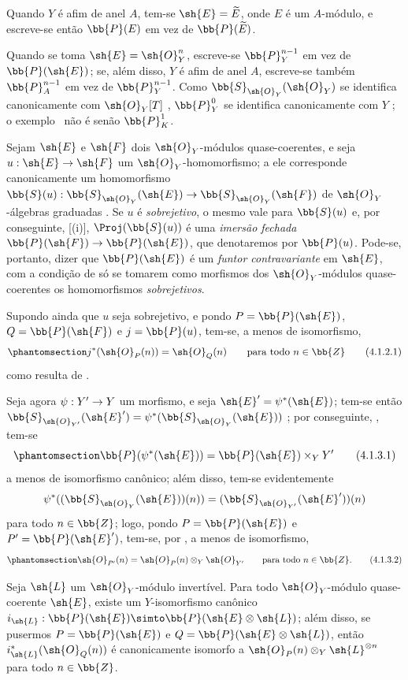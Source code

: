 \documentclass[oneside,10pt]{amsart}
\makeatletter
\newcommand{\ega@arrow}[2]{\mathchoice{#1}{#2}{#2}{#2}}
\renewcommand{\to}{\ega@arrow{\longrightarrow}{\rightarrow}}
\newcommand{\oldpage}[2][]{\marginnote{\normalfont\footnotesize\textbf{#1}~|~#2}\ignorespaces}
\let\EGAOriginalLabel\label
\renewcommand{\label}[1]{\phantomsection\EGAOriginalLabel{#1}}
\makeatother
\begin{document}
Quando $Y$ é afim de anel $A$, tem-se $\sh{E}=\widetilde{E}$, onde $E$ é um $A$-módulo, e escreve-se então $\bb{P}(E)$ em vez de $\bb{P}(\widetilde{E})$.

Quando se toma $\sh{E}=\sh{O}_Y^n$, escreve-se $\bb{P}_Y^{n-1}$ em vez de $\bb{P}(\sh{E})$;
se, além disso, $Y$ é afim de anel $A$, escreve-se também $\bb{P}_A^{n-1}$ em vez de $\bb{P}_Y^{n-1}$.
Como $\bb{S}_{\sh{O}_Y}(\sh{O}_Y)$ se identifica canonicamente com $\sh{O}_Y[T]$ , $\bb{P}_Y^0$ se identifica canonicamente com $Y$ ;
o exemplo~ não é senão $\bb{P}_K^1$.

\begin{env}[4.1.2]
\label{II.4.1.2}
Sejam $\sh{E}$ e $\sh{F}$ dois $\sh{O}_Y$-módulos quase-coerentes, e seja $u:\sh{E}\to\sh{F}$ um $\sh{O}_Y$-homomorfismo;
a ele corresponde canonicamente um homomorfismo $\bb{S}(u):\bb{S}_{\sh{O}_Y}(\sh{E})\to\bb{S}_{\sh{O}_Y}(\sh{F})$ de $\sh{O}_Y$-álgebras graduadas .
Se $u$ é \emph{sobrejetivo}, o mesmo vale para $\bb{S}(u)$ e, por conseguinte, [(i)], $\Proj(\bb{S}(u))$ é uma \emph{imersão fechada} $\bb{P}(\sh{F})\to\bb{P}(\sh{E})$, que denotaremos por $\bb{P}(u)$.
Pode-se, portanto, dizer que $\bb{P}(\sh{E})$ é um \emph{funtor contravariante} em $\sh{E}$, com a condição de só se tomarem como morfismos dos $\sh{O}_Y$-módulos quase-coerentes os homomorfismos \emph{sobrejetivos}.

Supondo ainda que $u$ seja sobrejetivo, e pondo $P=\bb{P}(\sh{E})$, $Q=\bb{P}(\sh{F})$ e $j=\bb{P}(u)$, tem-se, a menos de isomorfismo,
\[
\label{II.4.1.2.1}
  j^*(\sh{O}_P(n)) = \sh{O}_Q(n)
  \qquad\mbox{para todo $n\in\bb{Z}$}
  \tag{4.1.2.1}
\]
como resulta de .
\end{env}

\begin{env}[4.1.3]
\label{II.4.1.3}
Seja agora $\psi:Y'\to Y$ um morfismo, e seja $\sh{E}'=\psi^*(\sh{E})$;
tem-se então $\bb{S}_{\sh{O}_{Y'}}(\sh{E}')=\psi^*(\bb{S}_{\sh{O}_Y}(\sh{E}))$ ;
por conseguinte, , tem-se
\[
\label{II.4.1.3.1}
  \bb{P}(\psi^*(\sh{E})) = \bb{P}(\sh{E})\times_Y Y'
  \tag{4.1.3.1}
\]
a menos de isomorfismo canônico;
além disso, tem-se evidentemente
\[
  \psi^*((\bb{S}_{\sh{O}_Y}(\sh{E}))(n)) = (\bb{S}_{\sh{O}_{Y'}}(\sh{E}'))(n)
\]
para todo $n\in\bb{Z}$; logo, pondo $P=\bb{P}(\sh{E})$ e $P'=\bb{P}(\sh{E}')$, tem-se, por , a menos de isomorfismo,
\[
\label{II.4.1.3.2}
  \sh{O}_{P'}(n) = \sh{O}_P(n)\otimes_Y\sh{O}_{Y'}
  \qquad\mbox{para todo $n\in\bb{Z}$.}
  \tag{4.1.3.2}
\]
\end{env}
\oldpage[II]{72}
\begin{proposition}[4.1.4]
\label{II.4.1.4}
Seja $\sh{L}$ um $\sh{O}_Y$-módulo invertível.
Para todo $\sh{O}_Y$-módulo quase-coerente $\sh{E}$, existe um $Y$-isomorfismo canônico $i_\sh{L}:\bb{P}(\sh{E})\simto\bb{P}(\sh{E}\otimes\sh{L})$;
além disso, se pusermos $P=\bb{P}(\sh{E})$ e $Q=\bb{P}(\sh{E}\otimes\sh{L})$, então $i_\sh{L}^*(\sh{O}_Q(n))$ é canonicamente isomorfo a $\sh{O}_P(n)\otimes_Y\sh{L}^{\otimes n}$ para todo $n\in\bb{Z}$.
\end{proposition}
\end{document}
